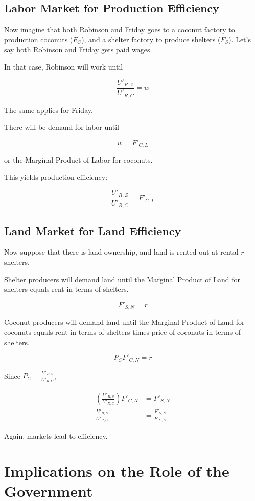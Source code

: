 \documentclass[11pt]{scrartcl}
\begin{document}
\subsection{Labor Market for Production Efficiency}

Now imagine that both Robinson and Friday goes to a coconut factory to production coconuts ($F_C$), and a shelter factory to produce shelters ($F_S$). Let's say both Robinson and Friday gets paid wages.

In that case, Robinson will work until

\[\frac{U'_{R,Z}}{U'_{R,C}} = w\]

The same applies for Friday.

There will be demand for labor until

\[ w = F'_{C,L}\] 

or the Marginal Product of Labor for coconuts.

This yields production efficiency:

\[\frac{U'_{R,Z}}{U'_{R,C}} = F'_{C,L}\] 

\subsection{Land Market for Land Efficiency}

Now suppose that there is land ownership, and land is rented out at rental $r$ shelters. 

Shelter producers will demand land until the Marginal Product of Land for shelters equals rent in terms of shelters.

\[ F'_{S,N} = r \]

Coconut producers will demand land until the Marginal Product of Land for coconuts equals rent in terms of shelters times price of coconuts in terms of shelters.

\[ P_C F'_{C,N} = r\]


Since $P_C = \frac{U'_{R,S}}{U'_{R,C}}$, 

\begin{align*}
\left( \frac{U'_{R,S}}{U'_{R,C}} \right) F'_{C,N} &= F'_{S,N} \\
\frac{U'_{R,S}}{U'_{R,C}} &= \frac{F'_{S,N}}{F'_{C,N}}
\end{align*}

Again, markets lead to efficiency.

\section{Implications on the Role of the Government}
\end{document}
